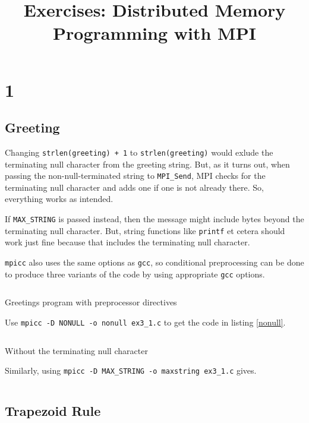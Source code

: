 \documentclass[a4paper]{article}
\title{Exercises: Distributed Memory Programming with MPI}
\date{}
\newenvironment{code}{\captionsetup{type=listing}}{}
\begin{document}
\maketitle
\section*{1}
\subsection*{Greeting}
Changing \texttt{strlen(greeting) + 1} to \texttt{strlen(greeting)}
would exlude the terminating null character from the greeting string.
But, as it turns out, when passing the non-null-terminated string
to \texttt{MPI\_Send}, MPI checks for the terminating null character
and adds one if one is not already there. So, everything works as 
intended.

If \texttt{MAX\_STRING} is passed instead, then the message might include
bytes beyond the terminating null character. But, string functions like
\texttt{printf} et cetera should work just fine because that includes
the terminating null character.

\texttt{mpicc} also uses the same options as \texttt{gcc}, so
conditional preprocessing can be done to produce three variants of
the code by using appropriate \texttt{gcc} options.

\begin{code}
\inputminted[samepage=false, breaklines, linenos, firstline=1]{c}{codes/ex3_1.c}
\label{normal}
\caption{Greetings program with preprocessor directives}
\end{code}

Use \texttt{mpicc -D NONULL -o nonull ex3\_1.c} to get the code in
listing \ref{nonull}.

\begin{code}
\inputminted[samepage=false, breaklines, breakanywhere, linenos=true, firstline=8709]{c}{codes/ex3_1_nonull.c}
\label{nonull}
\caption{Without the terminating null character}
\end{code}



Similarly, using \texttt{mpicc -D MAX\_STRING -o maxstring ex3\_1.c}
gives.

\begin{code}
\inputminted[breaklines, linenos, firstline=8709]{c}{codes/ex3_1_fullbuffer.c}
\end{code}

\subsection*{Trapezoid Rule}
\end{document}
